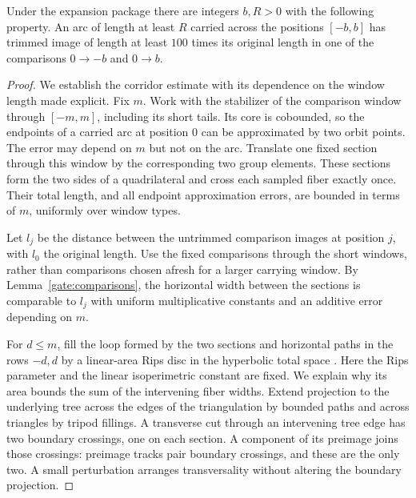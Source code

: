 \begin{lemma}[Flaring]\label{gate:flaring}
Under the expansion package there are integers $b,R>0$ with the following
property.  An arc of length at least $R$ carried across the positions
$[-b,b]$ has trimmed image of length at least $100$ times its original
length in one of the comparisons $0\to-b$ and $0\to b$.
\end{lemma}
\begin{proof}
We establish the corridor estimate with its dependence on the window
length made explicit.  Fix $m$.  Work with the stabilizer of the comparison
window through $[-m,m]$, including its short tails.  Its core is cobounded,
so the endpoints of a carried arc at position $0$ can be approximated by
two orbit points.  The error may depend on $m$ but not on the arc.  Translate
one fixed section through this window by the corresponding two group
elements.  These sections form the two sides of a quadrilateral and cross
each sampled fiber exactly once.  Their total length, and all endpoint
approximation errors, are bounded in terms of $m$, uniformly over window
types.

Let $l_j$ be the distance between the untrimmed comparison images at
position $j$, with $l_0$ the original length.  Use the fixed comparisons
through the short windows, rather than comparisons chosen afresh for a
larger carrying window.  By Lemma~\ref{gate:comparisons}, the horizontal
width between the sections is comparable to $l_j$ with uniform
multiplicative constants and an additive error depending on $m$.

For $d\le m$, fill the loop formed by the two sections and horizontal
paths in the rows $-d,d$ by a linear-area Rips disc in the hyperbolic total
space \cite[Proposition~III.H.2.7]{BridsonHaefliger1999}.
Here the Rips parameter and the linear isoperimetric constant are
fixed.  We explain why its area bounds the sum of the intervening fiber
widths.  Extend projection to the underlying tree across the edges of the
triangulation by bounded paths and across triangles by tripod fillings.
A transverse cut through an intervening tree edge has two boundary
crossings, one on each section.  A component of its preimage joins those
crossings: preimage tracks pair boundary crossings, and these are the only
two.  A small perturbation arranges transversality without altering the
boundary projection.


\end{proof}
